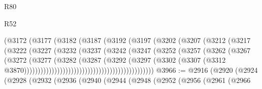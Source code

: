 \begin{lexlean}{R80}
\begin{lexlean}{R52}
\begin{coremodule}
{{{{{{{{{{{{{{{{{{{{{{{{{{{{{{{{{{{{{{{{{{{{{{{{{{{{{{{{{{{{{{{{{{{{{{{{{{{{{{{{{{{{{{{{{{{{{{{{{{{{{{{{{{{{{{{{{{{{{{{{{{{{{{{{{{{{{{{{{{{{{{{{{{{{{{{{{{{{{{{{{{{{{{{{{{{{{{{{{{{{{{{{{{{{{{{{{{{{{{                                        (@3172
                                          (@3177
                                            (@3182
                                              (@3187
                                                (@3192
                                                  (@3197
                                                    (@3202
                                                      (@3207
                                                        (@3212
                                                          (@3217
                                                            (@3222
                                                              (@3227
                                                                (@3232
                                                                  (@3237
                                                                    (@3242
                                                                      (@3247
                                                                        (@3252
                                                                          (@3257
                                                                            (@3262
                                                                              (@3267
                                                                                (@3272
                                                                                  (@3277
                                                                                    (@3282
                                                                                      (@3287
                                                                                        (@3292
                                                                                          (@3297
                                                                                            (@3302
                                                                                              (@3307
                                                                                                (@3312
                                                                                                  @3870)))))))))))))))))))))))))))))))))))))))))))))))
@3966 := @2916
    (@2920
      (@2924
        (@2928
          (@2932
            (@2936
              (@2940
                (@2944
                  (@2948
                    (@2952
                      (@2956
                        (@2961
                          (@2966
}}}}}}}}}}}}}}}}}}}}}}}}}}}}}}}}}}}}}}}}}}}}}}}}}}}}}}}}}}}}}}}}}}}}}}}}}}}}}}}}}}}}}}}}}}}}}}}}}}}}}}}}}}}}}}}}}}}}}}}}}}}}}}}}}}}}}}}}}}}}}}}}}}}}}}}}}}}}}}}}}}}}}}}}}}}}}}}}}}}}}}}}}}}}}}}}}}}}}}
\end{coremodule}
\end{lexlean}
\end{lexlean}
